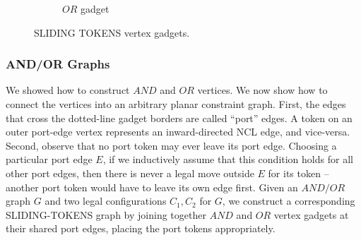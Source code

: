 \begin{figure} [H]
\begin{subfigure}[b]{0.4\textwidth}
\begin{scaletikzpicturetowidth}{\textwidth}
    \end{scaletikzpicturetowidth}
    \caption{$OR$ gadget}
    \label{fig:or_gadget_sliding_token}
  \end{subfigure}
  \caption{SLIDING TOKENS vertex gadgets.}
  \label{fig:and_or_gadgets_sliding_token}
\end{figure}

\subsubsection{AND/OR Graphs}\label{subsubsection:and_or}
We showed how to construct $AND$ and $OR$ vertices. We now show how to connect the vertices into an arbitrary planar constraint graph.
First, the edges that cross the dotted-line gadget borders are called “port” edges. A token on an outer port-edge vertex represents an
inward-directed NCL edge, and vice-versa. Second, observe that no port token may ever leave its port edge. Choosing a particular port
edge $E$, if we inductively assume that this condition holds for all other port edges, then there is never a legal move outside $E$ for
its token – another port token would have to leave its own edge first.
Given an $AND/OR$ graph $G$ and two legal configurations $C_1, C_2$ for $G$, we construct a corresponding SLIDING-TOKENS graph by joining together
$AND$ and $OR$ vertex gadgets at their shared port edges, placing the port tokens appropriately.


